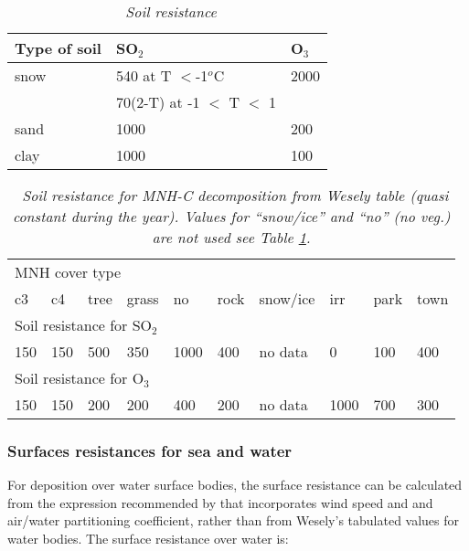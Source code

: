 \begin{table}
\begin{center}
\begin{tabular}{lll}\hline
Type of soil & SO$_2$                    & O$_3$  \\ \hline
snow           & 540 at T $ < $-1$^o$C      & 2000   \\ 
               & 70(2-T) at -1 $<$ T $<$ 1 &        \\ 
sand           & 1000                      & 200    \\ 
clay           & 1000                      & 100    \\  \hline
\end{tabular}
\caption{\sl ~{Soil resistance}}
\label{rsol}
\end{center}
\end{table}

\begin{table}
\begin{center}
\begin{tabular}{llllllllll}\hline
\multicolumn{10}{l}{MNH cover type}\\
 c3 & c4 & tree & grass & no & rock & snow/ice & irr & park & town \\ 
\hline
\multicolumn{10}{l}{Soil resistance for SO$_2$}\\
150 & 150 & 500 & 350 & 1000 & 400 & no data & 0 & 100 & 400 \\
\hline
\multicolumn{10}{l}{Soil resistance for O$_3$}\\
150 & 150 & 200 & 200 & 400 & 200 & no data & 1000 & 700 & 300 \\
\hline  
\end{tabular}
\caption{\sl ~{Soil resistance for MNH-C decomposition from Wesely
table (quasi constant during the year). Values for ``snow/ice'' and
``no'' (no veg.) are not used see Table \ref{rsol}.}} 
\label{rcsoil}
\end{center}
\end{table}

\subsubsection*{Surfaces resistances for sea and water}
For deposition over water surface bodies, the surface resistance can
be calculated from the expression recommended by \cite{Sehmel1980} that
incorporates wind speed and 
and air/water partitioning coefficient, rather than from Wesely's
tabulated values for water bodies. The surface resistance over water
is: 

